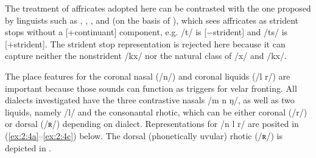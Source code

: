 \ea\label{ex:2:3}
\begin{xlist}%
\begin{multicols}{3}\raggedcolumns%
\ex\label{ex:2:3a}
\columnbreak
\ex \label{ex:2:3b}
\columnbreak
\ex \label{ex:2:3c}
\end{multicols}
\end{xlist}
\z

The treatment of affricates adopted here can be contrasted with the one proposed by linguists such as \citet{LaCharité1993}, \citet{Rubach1994}, \citet{Clements1999}, \citet{Kim2001} and \citet{Kehrein2002} (on the basis of \citealt{JakobsonEtAl1951}), which sees affricates as strident stops without a [+continuant] component, e.g. /t/ is [−strident] and /ts/ is [+strident]. The strident stop representation is rejected here because it can capture neither the nonstrident  /kx/ nor the natural class of /x/ and /kx/.\largerpage

The place features for the coronal nasal (/n/) and coronal liquids (/l r/) are important because those sounds can function as triggers for velar fronting. All dialects investigated have the three contrastive nasals /m n ŋ/, as well as two liquids, namely /l/ and the consonantal rhotic, which can be either coronal (/r/) or dorsal (/ʀ/) depending on dialect. Representations for /n l r/ are posited in (\ref{ex:2:4a}--\ref{ex:2:4c}) below. The dorsal (phonetically uvular) rhotic (/ʀ/) is depicted in .

